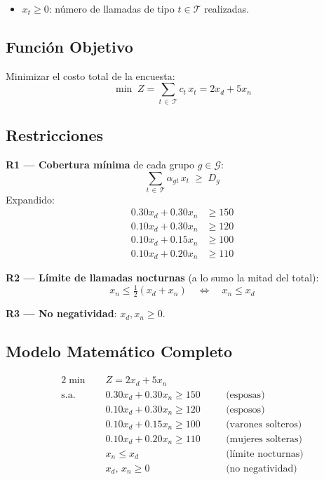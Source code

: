 \documentclass[12pt,a4paper]{article}
\newcommand{\cset}[1]{\mathcal{#1}}            %
\begin{document}
\begin{varbox}
\begin{itemize}[leftmargin=1.5em]
  \item $x_t \geq 0$: número de llamadas de tipo $t \in \mathcal{T}$ realizadas.
\end{itemize}
\end{varbox}

\subsection{Función Objetivo}

\begin{fobox}
Minimizar el costo total de la encuesta:
\[
  \min\; Z = \sum_{t\,\in\,\cset{T}} c_t\,x_t = 2x_d + 5x_n
\]
\end{fobox}

\subsection{Restricciones}

\begin{restbox}
\textbf{R1 — Cobertura mínima} de cada grupo $g \in \cset{G}$:
\[
  \sum_{t\,\in\,\cset{T}} \alpha_{gt}\,x_t \;\geq\; D_g
\]
Expandido:
\begin{align*}
  0.30x_d + 0.30x_n &\geq 150 \tag{R1-ES}\\
  0.10x_d + 0.30x_n &\geq 120 \tag{R1-EO}\\
  0.10x_d + 0.15x_n &\geq 100 \tag{R1-VS}\\
  0.10x_d + 0.20x_n &\geq 110 \tag{R1-MS}
\end{align*}

\textbf{R2 — Límite de llamadas nocturnas}
(a lo sumo la mitad del total):
\[
  x_n \leq \tfrac{1}{2}(x_d + x_n)
  \quad\Leftrightarrow\quad x_n \leq x_d
\]

\textbf{R3 — No negatividad}: $x_d, x_n \geq 0$.
\end{restbox}

\subsection{Modelo Matemático Completo}

\begin{modelbox}
\begin{alignat*}{2}
  \min\quad & Z = 2x_d + 5x_n\\[4pt]
  \text{s.a.}\quad
  & 0.30x_d + 0.30x_n \geq 150 &\quad& \text{(esposas)}\\
  & 0.10x_d + 0.30x_n \geq 120 &\quad& \text{(esposos)}\\
  & 0.10x_d + 0.15x_n \geq 100 &\quad& \text{(varones solteros)}\\
  & 0.10x_d + 0.20x_n \geq 110 &\quad& \text{(mujeres solteras)}\\
  & x_n \leq x_d               &\quad& \text{(límite nocturnas)}\\
  & x_d,\, x_n \geq 0          &\quad& \text{(no negatividad)}
\end{alignat*}
\end{modelbox}
\end{document}
